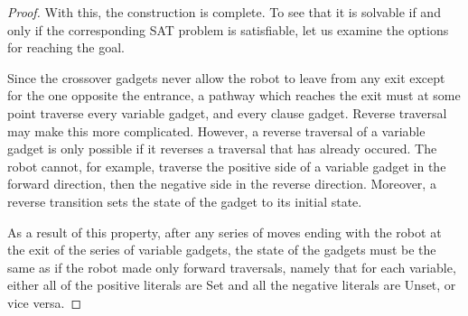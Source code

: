 \begin{proof}
    With this, the construction is complete. To see that it is solvable if and only if the corresponding SAT problem is satisfiable, let us examine the options for reaching the goal.

    Since the crossover gadgets never allow the robot to leave from any exit except for the one opposite the entrance, a pathway which reaches the exit must at some point traverse every variable gadget, and every clause gadget. Reverse traversal may make this more complicated. However, a reverse traversal of a variable gadget is only possible if it reverses a traversal that has already occured. The robot cannot, for example, traverse the positive side of a variable gadget in the forward direction, then the negative side in the reverse direction. Moreover, a reverse transition sets the state of the gadget to its initial state. 
    
    As a result of this property, after any series of moves ending with the robot at the exit of the series of variable gadgets, the state of the gadgets must be the same as if the robot made only forward traversals, namely that for each variable, either all of the positive literals are Set and all the negative literals are Unset, or vice versa.


\end{proof}

%
%

